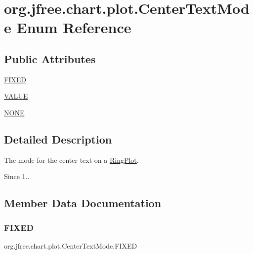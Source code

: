 \hypertarget{enumorg_1_1jfree_1_1chart_1_1plot_1_1_center_text_mode}{}\section{org.\+jfree.\+chart.\+plot.\+Center\+Text\+Mode Enum Reference}
\label{enumorg_1_1jfree_1_1chart_1_1plot_1_1_center_text_mode}
\subsection*{Public Attributes}
\begin{DoxyCompactItemize}
\item 
\mbox{\hyperlink{enumorg_1_1jfree_1_1chart_1_1plot_1_1_center_text_mode_a28a61a12d960a2ebea64f911c59177cc}{F\+I\+X\+ED}}
\item 
\mbox{\hyperlink{enumorg_1_1jfree_1_1chart_1_1plot_1_1_center_text_mode_a4d0a1a2e333a9542cf2a18a0444abe0d}{V\+A\+L\+UE}}
\item 
\mbox{\hyperlink{enumorg_1_1jfree_1_1chart_1_1plot_1_1_center_text_mode_a8ff0c6edb9367518b9a55b176965a4db}{N\+O\+NE}}
\end{DoxyCompactItemize}


\subsection{Detailed Description}
The mode for the center text on a \mbox{\hyperlink{classorg_1_1jfree_1_1chart_1_1plot_1_1_ring_plot}{Ring\+Plot}}.

\begin{DoxySince}{Since}
1.. 
\end{DoxySince}


\subsection{Member Data Documentation}
\mbox{\label{enumorg_1_1jfree_1_1chart_1_1plot_1_1_center_text_mode_a28a61a12d960a2ebea64f911c59177cc}} 
\subsubsection{\texorpdfstring{F\+I\+X\+ED}{FIXED}}
{\footnotesize\ttfamily org.\+jfree.\+chart.\+plot.\+Center\+Text\+Mode.\+F\+I\+X\+ED}

